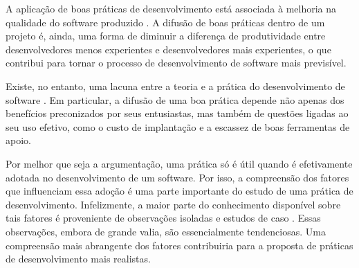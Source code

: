 \documentclass{article}
\begin{document}

A aplicação de boas práticas de desenvolvimento está associada à melhoria na
qualidade do software produzido \cite{grady1993}. A difusão de boas práticas
dentro de um projeto é, ainda, uma forma de diminuir a diferença de
produtividade entre desenvolvedores menos experientes e desenvolvedores mais
experientes, o que contribui para tornar o processo de desenvolvimento de
software mais previsível.

Existe, no entanto, uma lacuna entre a teoria e a prática do desenvolvimento de
software \cite{glass1996}. Em particular, a difusão de uma boa prática depende
não apenas dos benefícios preconizados por seus entusiastas, mas também de
questões ligadas ao seu uso efetivo, como o custo de implantação e a escassez de
boas ferramentas de apoio. 

Por melhor que seja a argumentação, uma prática só é útil quando é efetivamente
adotada no desenvolvimento de um software. Por isso, a compreensão dos fatores
que influenciam essa adoção é uma parte importante do estudo de uma prática de
desenvolvimento. Infelizmente, a maior parte do conhecimento disponível sobre
tais fatores é proveniente de observações isoladas e estudos de caso
\cite{crowston2005}. Essas observações, embora de grande valia, são
essencialmente tendenciosas. Uma compreensão mais abrangente dos fatores
contribuiria para a proposta de práticas de desenvolvimento mais realistas.

%

\end{document}
